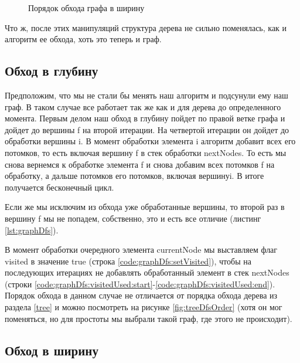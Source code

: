 \documentclass[../../article.tex]{subfiles}
\begin{document}
\begin{figure}
    \caption{Порядок обхода графа в ширину}
    \label{fig:graphBfsOrder}
\end{figure}

Что ж, после этих манипуляций структура дерева не сильно поменялась, как и алгоритм ее обхода, хоть это теперь и граф.

\subsection{Обход в глубину}

Предположим, что мы не стали бы менять наш алгоритм и подсунули ему наш граф. В таком случае все работает так же как и для дерева до определенного момента. Первым делом наш обход в глубину пойдет по правой ветке графа и дойдет до вершины {\firacodebold f} на второй итерации. На четвертой итерации он дойдет до обработки вершины {\firacodebold i}. В момент обработки элемента {\firacodebold i} алгоритм добавит всех его потомков, то есть включая вершину {\firacodebold f} в стек обработки {\firacodebold nextNodes}. То есть мы снова вернемся к обработке элемента {\firacodebold f} и снова добавим всех потомков {\firacodebold f} на обработку, а дальше потомков его потомков, включая вершину{\firacodebold i}. В итоге получается бесконечный цикл.

Если же мы исключим из обхода уже обработанные вершины, то второй раз в вершину {\firacodebold f} мы не попадем, собственно, это и есть все отличие (листинг \ref{lst:graphDfs}).

В момент обработки очередного элемента {\firacodebold currentNode} мы выставляем флаг {\firacodebold visited} в значение {\firacodebold true} (строка \ref{code:graphDfs:setVisited}), чтобы на последующих итерациях не добавлять обработанный элемент в стек {\firacodebold nextNodes} (строки \ref{code:graphDfs:visitedUsed:start}-\ref{code:graphDfs:visitedUsed:end}). Порядок обхода в данном случае не отличается от порядка обхода дерева из раздела \ref{tree} и можно посмотреть на рисунке \ref{fig:treeDfsOrder} (хотя он мог поменяться, но для простоты мы выбрали такой граф, где этого не происходит).

\subsection{Обход в ширину}
\end{document}
